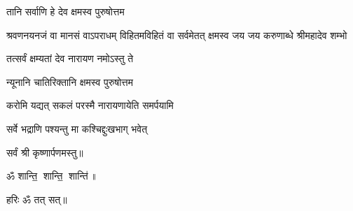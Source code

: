 
{तानि सर्वाणि हे देव क्षमस्व पुरुषोत्तम}

{श्रवणनयनजं वा मानसं वाऽपराधम्}
{विहितमविहितं वा सर्वमेतत् क्षमस्व}
{जय जय करुणाब्धे श्रीमहादेव शम्भो}

{तत्सर्वं क्षम्यतां देव नारायण नमोऽस्तु ते}

{न्यूनानि चातिरिक्तानि क्षमस्व पुरुषोत्तम}

{करोमि यद्यत् सकलं परस्मै नारायणायेति समर्पयामि}

{सर्वे भद्राणि पश्यन्तु मा कश्चिद्दुःखभाग् भवेत्}
\centerline{सर्वं श्री कृष्णार्पणमस्तु॥}
\centerline{ॐ शान्ति॒ शान्ति॒ शान्ति॑॥}
\centerline{हरिः ॐ तत् सत्॥}

\closesection